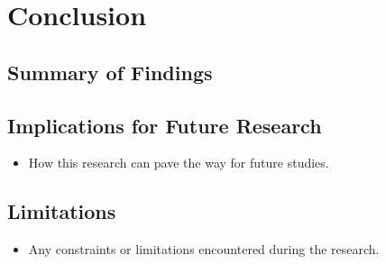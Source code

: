 \chapter{\rm\bfseries Conclusion}
\label{ch:conclusion}

\section{Summary of Findings}

\section{Implications for Future Research}
\begin{itemize}
    \item How this research can pave the way for future studies.
\end{itemize}

\section{Limitations}
\begin{itemize}
    \item Any constraints or limitations encountered during the research.
\end{itemize}

